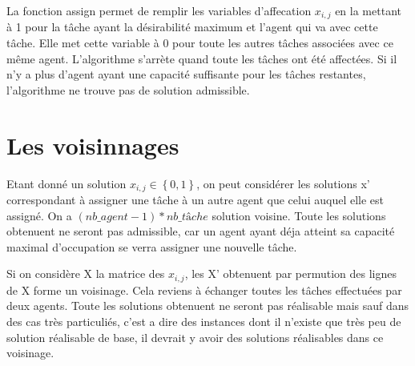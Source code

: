 \documentclass{article}
\begin{document}


La fonction assign permet de remplir les variables d'affecation $x_{i,j}$ en la mettant à 1 pour la tâche ayant la désirabilité maximum et l'agent qui va avec cette tâche. Elle met cette variable à 0 pour toute les autres tâches associées avec ce même agent.
L'algorithme s'arrète quand toute les tâches ont été affectées. Si il n'y a plus d'agent ayant une capacité suffisante pour les tâches restantes, l'algorithme ne trouve pas de solution admissible.

\section{Les voisinnages}

Etant donné un solution $x_{i,j}\in\left\{0,1\right\}$, on peut considérer les solutions x' correspondant à assigner une tâche à un autre agent que celui auquel elle est assigné. On a $(nb\_agent-1)*nb\_tâche$ solution voisine. Toute les solutions obtenuent ne seront pas admissible, car un agent ayant déja atteint sa capacité maximal d'occupation se verra assigner une nouvelle tâche.



Si on considère X la matrice des $x_{i,j}$, les X' obtenuent par permution des lignes de X forme un voisinage. Cela reviens à échanger toutes les tâches effectuées par deux agents. Toute les solutions obtenuent ne seront pas réalisable mais sauf dans des cas très particuliés, c'est a dire des instances dont il n'existe que très peu de solution réalisable de base, il devrait y avoir des solutions réalisables dans ce voisinage.
\end{document}
